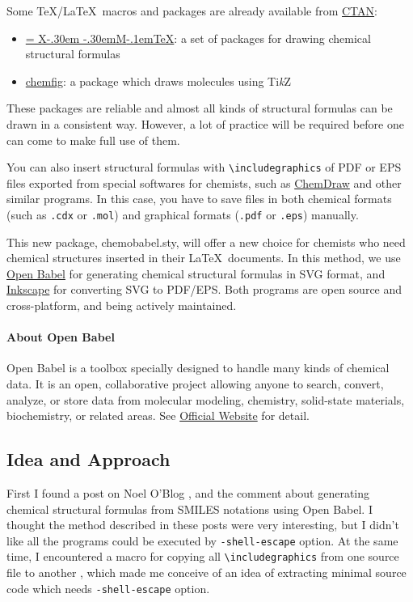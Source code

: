 \documentclass[12pt]{ltjsarticle}
\def\XyM{\ifnum\fam=-1\relax\fam=0\relax\fi\TestCount=\fam
  X\kern-.30em\smash{\raise.50ex\hbox{$\fam\TestCount\Upsilon$}}%
  \kern-.30em{M}}
\def\XyMTeX{\XyM\kern-.1em\TeX}
\def\Lpack#1{\textsf{#1}}
\def\TikZ{Ti\textit{k}Z}
\begin{document}
Some \TeX/\LaTeX\ macros and packages are already available from
\href{http://www.ctan.org/}{CTAN}:
\begin{itemize}
  \item \href{http://www.ctan.org/pkg/xymtex}{\XyMTeX}:
    a set of packages for drawing chemical structural formulas
\item \href{http://www.ctan.org/pkg/chemfig}{\Lpack{chemfig}}:
    a package which draws molecules using \TikZ
\end{itemize}
These packages are reliable and almost all kinds of structural formulas
can be drawn in a consistent way. However, a lot of practice will be
required before one can come to make full use of them.

You can also insert structural formulas with \verb|\includegraphics| of
PDF or EPS files exported from special softwares for chemists, such as
\href{http://www.cambridgesoft.com/Ensemble_for_Chemistry/ChemDraw/}{ChemDraw}
and other similar programs.
In this case, you have to save files in both chemical formats
(such as \verb|.cdx| or \verb|.mol|) and graphical formats
(\verb|.pdf| or \verb|.eps|) manually.

This new package, \Lpack{chemobabel.sty}, will offer a new choice for
chemists who need chemical structures inserted in their \LaTeX\ documents.
In this method, we use \href{http://openbabel.org/}{Open Babel} for
generating chemical structural formulas in SVG format,
and \href{https://inkscape.org/en/}{Inkscape} for converting SVG to PDF/EPS.
Both programs are open source and cross-platform, and being actively maintained.

\paragraph{About Open Babel}

Open Babel is a toolbox specially designed to handle many kinds of
chemical data. It is an open, collaborative project allowing anyone to search,
convert, analyze, or store data from molecular modeling, chemistry,
solid-state materials, biochemistry, or related areas.
See \href{http://openbabel.org/}{Official Website} for detail.

\clearpage

\subsection{Idea and Approach}

First I found a post on Noel O'Blog \cite{NOB1}, \cite{NOB2} and
the comment \cite{JLA} about generating chemical structural formulas
from SMILES notations using Open Babel.
I thought the method described in these posts were very interesting,
but I didn't like all the programs could be executed by
\verb|-shell-escape| option.
At the same time, I encountered a macro for copying all
\verb|\includegraphics| from one source file to another \cite{OKU},
which made me conceive of an idea of extracting minimal source code
which needs \verb|-shell-escape| option.
\end{document}
